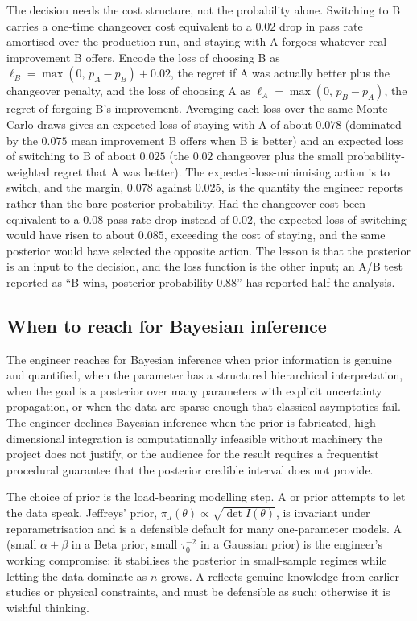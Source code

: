 The decision needs the cost structure, not the probability alone.
Switching to B carries a one-time changeover cost equivalent to a
$0.02$ drop in pass rate amortised over the production run, and
staying with A forgoes whatever real improvement B offers. Encode the
loss of choosing B as $\ell_{B} = \max(0,\, p_{A} - p_{B}) + 0.02$,
the regret if A was actually better plus the changeover penalty, and
the loss of choosing A as $\ell_{A} = \max(0,\, p_{B} - p_{A})$, the
regret of forgoing B's improvement. Averaging each loss over the same
Monte Carlo draws gives an expected loss of staying with A of about
$0.078$ (dominated by the $0.075$ mean improvement B offers when B is
better) and an expected loss of switching to B of about $0.025$ (the
$0.02$ changeover plus the small probability-weighted regret that A
was better). The expected-loss-minimising action is to switch, and
the margin, $0.078$ against $0.025$, is the quantity the engineer
reports rather than the bare posterior probability. Had the
changeover cost been equivalent to a $0.08$ pass-rate drop instead of
$0.02$, the expected loss of switching would have risen to about
$0.085$, exceeding the cost of staying, and the same posterior would
have selected the opposite action. The lesson is that the posterior
is an input to the decision, and the loss function is the other
input; an A/B test reported as ``B wins, posterior probability
$0.88$'' has reported half the analysis.

\subsection{When to reach for Bayesian inference}

The engineer reaches for Bayesian inference when prior information
is genuine and quantified, when the parameter has a structured
hierarchical interpretation, when the goal is a posterior over many
parameters with explicit uncertainty propagation, or when the data
are sparse enough that classical asymptotics fail. The engineer
declines Bayesian inference when the prior is fabricated,
high-dimensional integration is computationally infeasible without
machinery the project does not justify, or the audience for the
result requires a frequentist procedural guarantee that the
posterior credible interval does not provide.

\begin{mastery}
The choice of prior is the load-bearing modelling step. A
 or  prior
attempts to let the data speak. Jeffreys' prior, $\pi_{J}(\theta)
\propto \sqrt{\det I(\theta)}$, is invariant under reparametrisation
and is a defensible default for many one-parameter models. A
 (small
$\alpha + \beta$ in a Beta prior, small $\tau_{0}^{-2}$ in a
Gaussian prior) is the engineer's working compromise: it stabilises
the posterior in small-sample regimes while letting the data
dominate as $n$ grows. A  reflects genuine
knowledge from earlier studies or physical constraints, and must be
defensible as such; otherwise it is wishful thinking.
\end{mastery}

